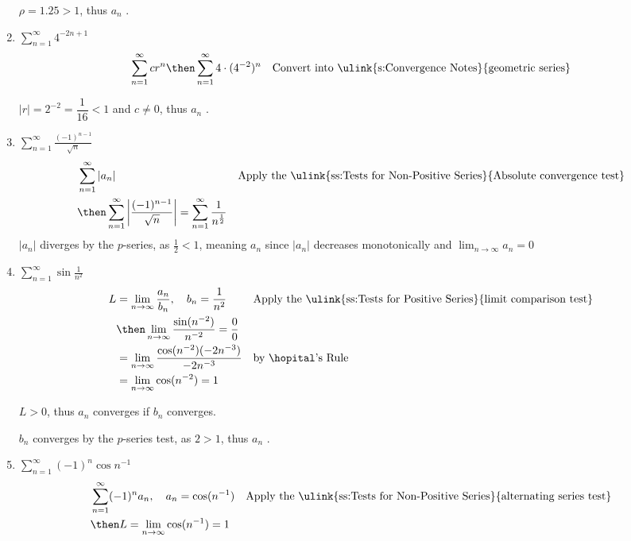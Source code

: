 \begin{enumerate}[itemsep=12em]
    \(\rho = 1.25 > 1 \), thus \(a_n\) .

  \vspace{-2em}
  \item \(\displaystyle \sum_{n=1}^{\infty} 4^{-2n+1}  \)
    \begin{align*}
      \sum_{n=1}^{\infty} cr^n
      \then \sum_{n=1}^{\infty} 4 \cdot (4^{-2})^n
      && \text{Convert into \ulink{s:Convergence Notes}{geometric series}}
    \end{align*}

  \(|r| = 2^{-2} = \dfrac{1}{16} < 1 \) and \(c\neq 0\), thus \(a_n\) .

  \item \(\displaystyle \sum_{n=1}^{\infty} \frac{(-1)^{n-1}}{\sqrt{n} }  \)
    \begin{align*}
      &\sum_{n=1}^{\infty} \left| a_n \right|
           && \text{Apply the \ulink{ss:Tests for Non-Positive Series}{Absolute convergence test}} \\
           &\then \sum_{n=1}^{\infty} \left|  \frac{(-1)^{n-1}}{\sqrt{n} }\right|
           = \sum_{n=1}^{\infty} \frac{1}{n^{\frac{1}{2}} }
    \end{align*}
    \(|a_n|\) diverges by the \(p\)-series, as \(\frac{1}{2} < 1\), meaning
    \(a_n\)  since \(|a_n|\) decreases monotonically and
    \(\lim_{n \to \infty} a_n = 0\)

  \vspace{-96pt}
  \item \(\displaystyle \sum_{n=1}^{\infty} \sin \frac{1}{n^2}  \)
    \begin{align*}
     L &= \lim_{n \to \infty} \frac{a_n}{b_n}, \quad b_n = \frac{1}{n^2}
       && \text{Apply the \ulink{ss:Tests for Positive Series}{limit comparison test}} \\
       &\then \lim_{n \to \infty} \frac{\sin(n^{-2})}{n^{-2}} =  \frac{0}{0} \\
       &= \lim_{n \to \infty} \frac{\cos (n^{-2})(-2n^{-3})}{-2n^{-3}}
       && \text{by \hopital's Rule} \\
       &= \lim_{n \to \infty} \cos (n^{-2}) = 1
    \end{align*}

    \(L > 0\), thus \(a_n\) converges if \(b_n\) converges.

    \(b_n\) converges by the \(p\)-series test, as \(2 > 1\), thus
    \(a_n\) .

  \vspace{-80pt}
  \item \(\displaystyle \sum_{n=1}^{\infty} (-1)^n \cos n^{-1} \)
    \begin{align*}
      &\sum_{n=1}^{\infty} (-1)^n a_n, \quad a_n = \cos (n^{-1})
      && \text{Apply the \ulink{ss:Tests for Non-Positive Series}{alternating series test}} \\
      &\then L = \lim_{n \to \infty} \cos (n^{-1}) = 1
    \end{align*}


\end{enumerate}
